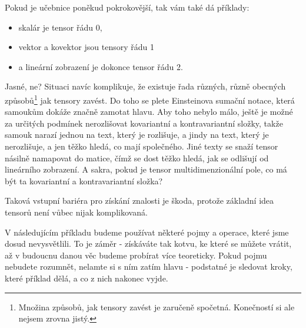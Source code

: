 \documentclass[a5paper,12pt]{amsbook}
\theoremstyle{definition}
\begin{document}
Pokud je učebnice poněkud pokrokovější, tak vám také dá příklady:
\begin{itemize}
  \item skalár je tensor řádu 0,
  \item vektor a kovektor jsou tensory řádu 1
  \item a lineární zobrazení je dokonce tensor řádu 2.
\end{itemize}

\noindent
Jasné, ne? Situaci navíc komplikuje, že existuje řada různých, různě obecných
způsobů\footnote{
	Množina způsobů, jak tensory zavést je zaručeně spočetná. Konečností si ale
	nejsem zrovna jistý.
} jak tensory zavést. Do toho se plete Einsteinova sumační notace, která samoukům
dokáže značně zamotat hlavu. Aby toho nebylo málo, ještě je možné za určitých podmínek
nerozlišovat kovariantní a kontravariantní složky, takže samouk narazí jednou na text,
který je rozlišuje, a jindy na text, který je nerozlišuje, a jen těžko hledá, co mají
společného. Jiné texty se snaží tensor násilně namapovat do matice, čímž se dost těžko
hledá, jak se odlišují od lineárního zobrazení. A sakra, pokud je tensor multidimenzionální
pole, co má být ta kovariantní a kontravariantní složka?

Taková vstupní bariéra pro získání znalosti je škoda, protože základní idea tensorů není
vůbec nijak komplikovaná.

V následujícím příkladu budeme používat některé pojmy a operace,
které jsme dosud nevysvětlili. To je záměr - získáváte tak kotvu, ke které se můžete
vrátit, až v budoucnu danou věc budeme probírat více teoreticky. Pokud pojmu nebudete
rozumnět, nelamte si s ním zatím hlavu - podstatné je sledovat kroky, které
příklad dělá, a co z nich nakonec vyjde.
\end{document}
